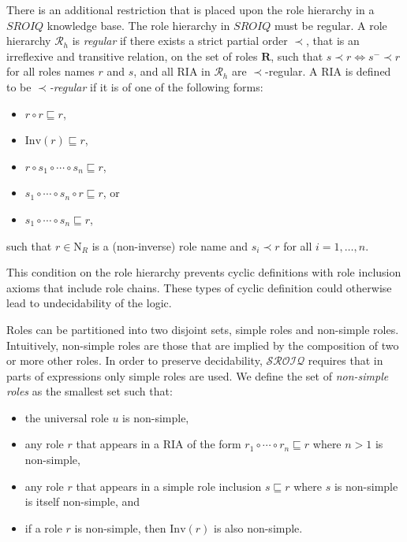 There is an additional restriction that is placed upon the role hierarchy in a $SROIQ$ knowledge base. The role hierarchy in $SROIQ$ must be regular. A role hierarchy $\mathcal{R}_h$ is \emph{regular} if there exists a strict partial order $\prec$, that is an irreflexive and transitive relation, on the set of roles $\mathbf{R}$, such that $s \prec r \iff s^- \prec r$ for all roles names $r$ and $s$, and all RIA in $\mathcal{R}_h$ are $\prec$-regular. A RIA is defined to be $\prec$\emph{-regular} if it is of one of the following forms:

\begin{itemize}
    \item $r \circ r \sqsubseteq r$,
    \item $\mathrm{Inv}(r) \sqsubseteq r$,
    \item $r \circ s_1 \circ \cdots \circ s_n \sqsubseteq r$,
    \item $s_1 \circ \cdots \circ s_n \circ r \sqsubseteq r$, or
    \item $s_1 \circ \cdots \circ s_n \sqsubseteq r$,
\end{itemize}

such that $r \in \mathrm{N}_R$ is a (non-inverse) role name and $s_i \prec r$ for all $i = 1, \dots, n$.

This condition on the role hierarchy prevents cyclic definitions with role inclusion axioms that include role chains. These types of cyclic definition could otherwise lead to undecidability of the logic.

Roles can be partitioned into two disjoint sets, simple roles and non-simple roles. Intuitively, non-simple roles are those that are implied by the composition of two or more other roles. In order to preserve decidability, $\mathcal{SROIQ}$ requires that in parts of expressions only simple roles are used. We define the set of \emph{non-simple roles} as the smallest set such that:

\begin{itemize}
    \item the universal role $u$ is non-simple,
    \item any role $r$ that appears in a RIA of the form $r_1 \circ \cdots \circ r_n \sqsubseteq r$ where $n > 1$ is non-simple,
    \item any role $r$ that appears in a simple role inclusion $s \sqsubseteq r$ where $s$ is non-simple is itself non-simple, and
    \item if a role $r$ is non-simple, then $\mathrm{Inv}(r)$ is also non-simple.
\end{itemize}

